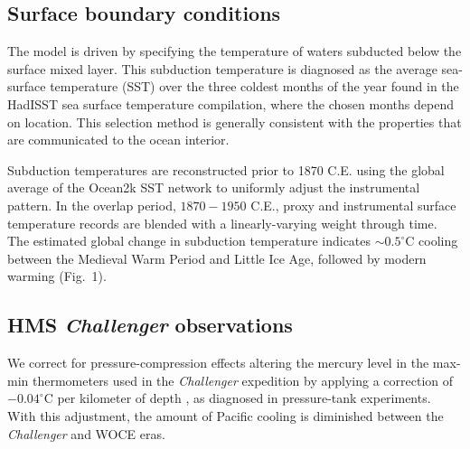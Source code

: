 \documentclass[12pt]{article}
\begin{document}
\subsection{Surface boundary conditions} 

The model is driven by specifying the temperature of waters subducted
below the surface mixed layer\cite{Stommel--1979:Determination}. This
subduction temperature is diagnosed as the average sea-surface
temperature (SST) over the three coldest months of the year found in
the HadISST sea surface temperature
compilation\cite{Rayner-Parker-2003:Global}, where the chosen months
depend on location. This selection method is generally consistent with
the properties that are communicated to the ocean
interior\cite{Williams-Marshall-1995:Does}.

Subduction temperatures are reconstructed prior to 1870 C.E. using the
global average of the Ocean2k SST network \cite{Mcgregor-2015:Robust}
to uniformly adjust the instrumental pattern.  In the overlap period,
$1870-1950$ C.E., proxy and instrumental surface temperature records
are blended with a linearly-varying weight through time. The estimated
global change in subduction temperature indicates $\sim0.5^\circ$C
cooling between the Medieval Warm Period and Little Ice Age, followed
by modern warming (Fig.~1).

\subsection{HMS {\it Challenger} observations} 

We correct for pressure-compression effects altering the mercury level
in the max-min thermometers used in the {\it Challenger} expedition by
applying a correction of $-0.04^\circ$C per kilometer of depth
\cite{Tait--1882:Pressure}, as diagnosed in pressure-tank
experiments. With this adjustment, the amount of Pacific cooling is
diminished between the {\it Challenger} and WOCE eras.

\end{document}
